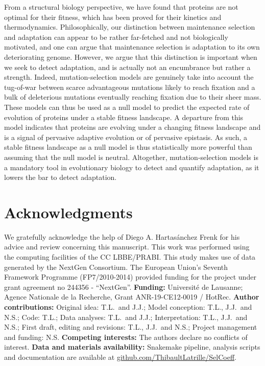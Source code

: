 \documentclass{article}
\begin{document}
    From a structural biology perspective, we have found that proteins are not optimal for their fitness, which has been proved for their kinetics and thermodynamics\cite{taverna_why_2002, goldstein_evolution_2011}.
    Philosophically, our distinction between maintenance selection and adaptation can appear to be rather far-fetched and not biologically motivated, and one can argue that maintenance selection is adaptation to its own deteriorating genome.
    However, we argue that this distinction is important when we seek to detect adaptation, and is actually not an encumbrance but rather a strength.
    Indeed, mutation-selection models are genuinely take into account the tug-of-war between scarce advantageous mutations likely to reach fixation and a bulk of deleterious mutations eventually reaching fixation due to their sheer mass.
    These models can thus be used as a null model to predict the expected rate of evolution of proteins\cite{spielman_relationship_2015, dosreis_how_2015} under a stable fitness landscape.
    A departure from this model indicates that proteins are evolving under a changing fitness landscape\cite{rodrigue_detecting_2017, tamuri_mutationselection_2021} and is a signal of pervasive adaptive evolution\cite{rodrigue_bayesian_2021} or of pervasive epistasis\cite{rodrigue_detecting_2017}.
    As such, a stable fitness landscape as a null model is thus statistically more powerful than assuming that the null model is neutral.
    Altogether, mutation-selection models is a mandatory tool in evolutionary biology to detect and quantify adaptation, as it lowers the bar to detect adaptation.

    \section*{Acknowledgments}
    \label{sec:acknowledgment}
    We gratefully acknowledge the help of Diego A. Hartasánchez Frenk for his advice and review concerning this manuscript.
    This work was performed using the computing facilities of the CC LBBE/PRABI\@.
    This study makes use of data generated by the NextGen Consortium.
    The European Union’s Seventh Framework Programme (FP7/2010-2014) provided funding for the project under grant agreement no 244356 - “NextGen”.
    \textbf{Funding:}
    Université de Lausanne; Agence Nationale de la Recherche, Grant ANR-19-CE12-0019 / HotRec.
    \textbf{Author contributions:}
    Original idea: T.L.\ and J.J.;
    Model conception: T.L., J.J.\ and N.S.;
    Code: T.L.;
    Data analyses: T.L.\ and J.J.;
    Interpretation: T.L., J.J.\ and N.S.;
    First draft, editing and revisions: T.L., J.J.\ and N.S.;
    Project management and funding: N.S\@.
    \textbf{Competing interests:}
    The authors declare no conflicts of interest.
    \textbf{Data and materials availability:}
    Snakemake pipeline, analysis scripts and documentation are available at \href{https://github.com/ThibaultLatrille/SelCoeff}{github.com/ThibaultLatrille/SelCoeff}.
\end{document}
